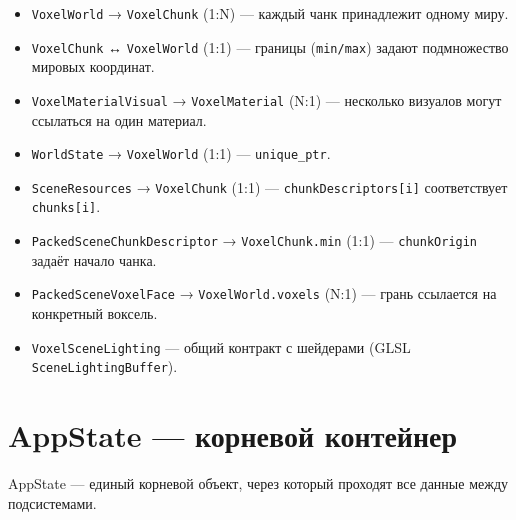 \documentclass[
  11pt,a4paper,oneside]{article}
\providecommand{\tightlist}{%
  \setlength{\itemsep}{0pt}\setlength{\parskip}{0pt}}
\providecommand{\tightlist}{%
  \setlength{\itemsep}{0pt}\setlength{\parskip}{0pt}}
\begin{document}
\begin{itemize}
\tightlist
\item
  \texttt{VoxelWorld} → \texttt{VoxelChunk} (1:N) --- каждый чанк принадлежит одному миру.
\item
  \texttt{VoxelChunk} ↔ \texttt{VoxelWorld} (1:1) --- границы (\texttt{min/max}) задают подмножество мировых координат.
\item
  \texttt{VoxelMaterialVisual} → \texttt{VoxelMaterial} (N:1) --- несколько визуалов могут ссылаться на один материал.
\item
  \texttt{WorldState} → \texttt{VoxelWorld} (1:1) --- \texttt{unique\_ptr}.
\item
  \texttt{SceneResources} → \texttt{VoxelChunk} (1:1) --- \texttt{chunkDescriptors{[}i{]}} соответствует \texttt{chunks{[}i{]}}.
\item
  \texttt{PackedSceneChunkDescriptor} → \texttt{VoxelChunk.min} (1:1) --- \texttt{chunkOrigin} задаёт начало чанка.
\item
  \texttt{PackedSceneVoxelFace} → \texttt{VoxelWorld.voxels} (N:1) --- грань ссылается на конкретный воксель.
\item
  \texttt{VoxelSceneLighting} --- общий контракт с шейдерами (GLSL \texttt{SceneLightingBuffer}).
\end{itemize}

\section{AppState --- корневой контейнер}\label{appstate--ux43aux43eux440ux43dux435ux432ux43eux439-ux43aux43eux43dux442ux435ux439ux43dux435ux440}

AppState --- единый корневой объект, через который проходят все данные между подсистемами.
\end{document}
